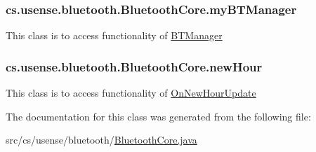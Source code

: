 \subsubsection[{my\+B\+T\+Manager}]{ cs.\+usense.\+bluetooth.\+Bluetooth\+Core.\+my\+B\+T\+Manager\hspace{0.3cm}{\ttfamily [private]}}\label{classcs_1_1usense_1_1bluetooth_1_1_bluetooth_core_a2024dd27fc068e407b40516db1fb6241}
This class is to access functionality of \hyperlink{classcs_1_1usense_1_1bluetooth_1_1_b_t_manager}{B\+T\+Manager} \hypertarget{classcs_1_1usense_1_1bluetooth_1_1_bluetooth_core_a1c186de0a5f8b59eb29433c322498b1c}{}
\subsubsection[{new\+Hour}]{ cs.\+usense.\+bluetooth.\+Bluetooth\+Core.\+new\+Hour\hspace{0.3cm}{\ttfamily [private]}}\label{classcs_1_1usense_1_1bluetooth_1_1_bluetooth_core_a1c186de0a5f8b59eb29433c322498b1c}
This class is to access functionality of \hyperlink{classcs_1_1usense_1_1bluetooth_1_1_on_new_hour_update}{On\+New\+Hour\+Update} 

The documentation for this class was generated from the following file\+:\begin{DoxyCompactItemize}
\item 
src/cs/usense/bluetooth/\hyperlink{_bluetooth_core_8java}{Bluetooth\+Core.\+java}\end{DoxyCompactItemize}
